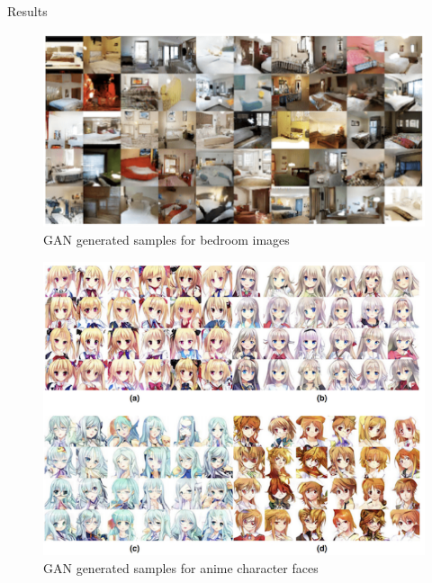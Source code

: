 \begin{frame}[allowframebreaks]{Results}
\framebreak
\begin{figure}
    \centering
    \includegraphics[height=0.8\textheight, width=\textwidth, keepaspectratio]{images/gan/gan_results_2.png}
    \caption*{GAN generated samples for bedroom images}
\end{figure}

\framebreak
\begin{figure}
    \centering
    \includegraphics[height=0.8\textheight, width=\textwidth, keepaspectratio]{images/gan/gan_results_3.png}
    \caption*{GAN generated samples for anime character faces}
\end{figure}
    
\end{frame}